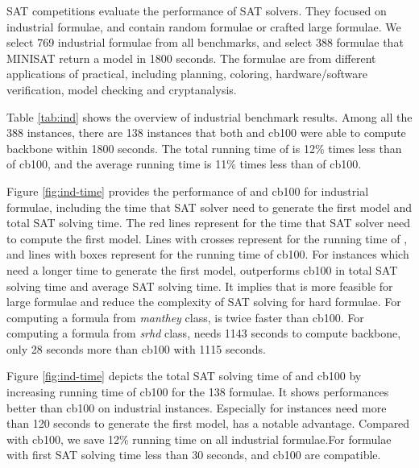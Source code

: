 SAT competitions evaluate the performance of SAT solvers. They focused on industrial formulae, and contain random formulae or crafted large formulae. We select 769 industrial formulae from all benchmarks, and select 388 formulae that MINISAT return a model in 1800 seconds. The formulae are from different applications of practical, including planning, coloring, hardware/software verification, model checking and cryptanalysis.

Table \ref{tab:ind} shows the overview of industrial benchmark results. Among all the 388 instances, there are 138 instances that both \tool and cb100 were able to compute backbone within 1800 seconds. The total running time of \tool is 12\% times less than of cb100, and the average running time is 11\% times less than of cb100.

Figure \ref{fig:ind-time} provides the performance of \tool and cb100 for industrial formulae, including the time that SAT solver need to generate the first model and total SAT solving time. The red lines represent for the time that SAT solver need to compute the first model. Lines with crosses represent for the running time of \tool, and lines with boxes represent for the running time of cb100. For instances which need a longer time to generate the first model, \tool outperforms cb100 in total SAT solving time and average SAT solving time. It implies that \tool is more feasible for large formulae and reduce the complexity of SAT solving for hard formulae. 
For computing a formula from \emph{manthey} class, \tool is twice faster than cb100.
For computing a formula from \emph{srhd} class, \tool needs 1143 seconds to compute backbone, only 28 seconds more than cb100 with 1115 seconds.
 

Figure \ref{fig:ind-time} depicts the total SAT solving time of \tool and cb100 by increasing running time of cb100 for the 138 formulae. It shows  \tool performances better than cb100 on industrial instances. Especially for instances need more than 120 seconds to generate the first model, \tool has a notable advantage. Compared with cb100, we save 12\% running time on all industrial formulae.For formulae with first SAT solving time less than 30 seconds, \tool and cb100 are compatible.

